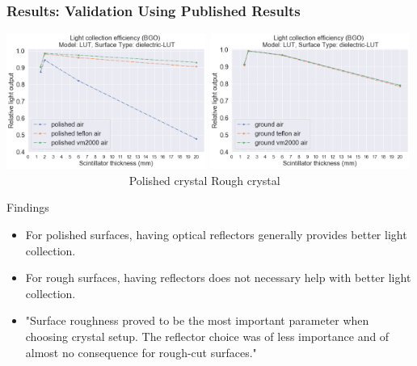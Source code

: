 \documentclass[xcolor=x11names, compress, handout]{beamer}
\renewcommand{\(}{\begin{columns}}
\renewcommand{\)}{\end{columns}}
\newcommand{\<}[1]{\begin{column}{#1}}
\renewcommand{\>}{\end{column}}
\begin{document}
\begin{frame}
\frametitle{Results: Validation Using Published Results}
\centering
\includegraphics[width=0.49\textwidth, height=0.45\textheight]{images/bgo_lightyield_polished1.png}
\includegraphics[width=0.49\textwidth, height=0.45\textheight]{images/bgo_lightyield_rough1.png}
\scriptsize  \flushleft~~~~~~~~~~~~~~~~~~~~~ Polished crystal \hspace{4cm} Rough crystal
\begin{block}{Findings}
\begin{itemize}
  \item For polished surfaces, having optical reflectors generally provides better light collection.
  \item For rough surfaces, having reflectors does not necessary help with better light collection.
  \item "Surface roughness proved to be the most important parameter when choosing crystal setup. The reflector choice was of less importance and of almost no consequence for rough-cut surfaces." \cite{janecek_moses_2008}
\end{itemize}
\end{block}
\end{frame}
\end{document}
